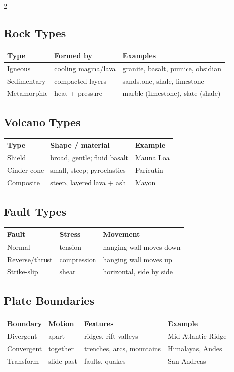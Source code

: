 \begin{multicols}{2}
\subsection*{Rock Types}
\begin{tabular}{@{}p{1.8cm}p{2.6cm}p{3.2cm}@{}}
\toprule
Type & Formed by & Examples\\ \midrule
Igneous & cooling magma/lava & granite, basalt, pumice, obsidian\\
Sedimentary & compacted layers & sandstone, shale, limestone\\
Metamorphic & heat + pressure & marble (limestone), slate (shale)\\ \bottomrule
\end{tabular}

\subsection*{Volcano Types}
\begin{tabular}{@{}p{1.8cm}p{3.6cm}p{2.2cm}@{}}
\toprule
Type & Shape / material & Example\\ \midrule
Shield & broad, gentle; fluid basalt & Mauna Loa\\
Cinder cone & small, steep; pyroclastics & Par\'icutin\\
Composite & steep, layered lava + ash & Mayon\\ \bottomrule
\end{tabular}

\subsection*{Fault Types}
\begin{tabular}{@{}p{2.1cm}p{1.7cm}p{3.8cm}@{}}
\toprule
Fault & Stress & Movement\\ \midrule
Normal & tension & hanging wall moves down\\
Reverse/thrust & compression & hanging wall moves up\\
Strike-slip & shear & horizontal, side by side\\ \bottomrule
\end{tabular}

\subsection*{Plate Boundaries}
\begin{tabular}{@{}p{1.6cm}p{1.4cm}p{2.6cm}p{2.0cm}@{}}
\toprule
Boundary & Motion & Features & Example\\ \midrule
Divergent & apart & ridges, rift valleys & Mid-Atlantic Ridge\\
Convergent & together & trenches, arcs, mountains & Himalayas, Andes\\
Transform & slide past & faults, quakes & San Andreas\\ \bottomrule
\end{tabular}


\end{multicols}

